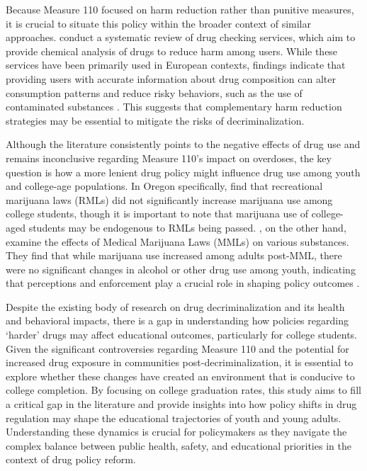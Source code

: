 \documentclass[12pt]{article}
\begin{document}
Because Measure 110 focused on harm reduction rather than punitive
measures, it is crucial to situate this policy within the broader context
of similar approaches.  conduct a systematic review
of drug checking services, which aim to provide chemical analysis of drugs
to reduce harm among users. While these services have been primarily used
in European contexts, findings indicate that providing users with accurate
information about drug composition can alter consumption patterns and
reduce risky behaviors, such as the use of contaminated substances
\cite{maghsoudi2021drug}. This suggests that complementary harm reduction
strategies may be essential to mitigate the risks of decriminalization.

Although the literature consistently points to the negative effects of drug
use and remains inconclusive regarding Measure 110's impact on overdoses,
the key question is how a more lenient drug policy might influence drug use
among youth and college-age populations. In Oregon specifically,
 find that recreational marijuana laws (RMLs) did not
significantly increase marijuana use among college students, though it is
important to note that marijuana use of college-aged students may be
endogenous to RMLs being passed. , on the other hand,
examine the effects of Medical Marijuana Laws (MMLs) on various substances.
They find that while marijuana use increased among adults post-MML, there
were no significant changes in alcohol or other drug use among youth,
indicating that perceptions and enforcement play a crucial role in shaping
policy outcomes \cite{wen2015effect}.

Despite the existing body of research on drug decriminalization and its
health and behavioral impacts, there is a gap in understanding how policies
regarding `harder' drugs may affect educational outcomes, particularly for
college students. Given the significant controversies regarding Measure 110
and the potential for increased drug exposure in communities
post-decriminalization, it is essential to explore whether these changes
have created an environment that is conducive to college completion. By
focusing on college graduation rates, this study aims to fill a critical
gap in the literature and provide insights into how policy shifts in drug
regulation may shape the educational trajectories of youth and young
adults. Understanding these dynamics is crucial for policymakers as they
navigate the complex balance between public health, safety, and educational
priorities in the context of drug policy reform.
\end{document}
